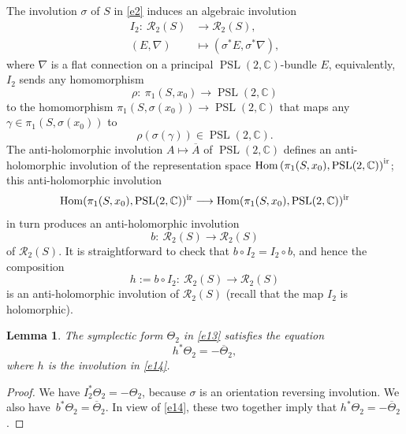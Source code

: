 \documentclass[pdftex]{sigma}
\numberwithin{equation}{section}
\newtheorem{Lemma}[Theorem]{Lemma}
\begin{document}
The involution $\sigma$ of $S$ in \eqref{e2} induces an algebraic involution
\begin{align*}
I_2\colon\ {\mathcal R}_2(S) &\longrightarrow {\mathcal R}_2(S), \\
(E, \nabla)&\longmapsto (\sigma^*E, \sigma^*{\nabla}),
\end{align*}
where $\nabla$ is a flat connection on a principal $\operatorname{PSL}(2,{\mathbb C})$-bundle $E$,
equivalently, $I_2$ sends any homomorphism
\[
\rho\colon\
\pi_1(S, x_0) \longrightarrow \operatorname{PSL}(2, {\mathbb C})
\]
 to the homomorphism
$\pi_1(S, \sigma(x_0)) \longrightarrow \operatorname{PSL}(2,{\mathbb C})$ that maps any
$\gamma \in \pi_1(S, \sigma(x_0))$ to
\[
\rho(\sigma(\gamma))
\in \operatorname{PSL}(2,{\mathbb C}).\]
The anti-holomorphic involution $A \longmapsto \overline{A}$
of $\operatorname{PSL}(2,{\mathbb C})$ defines an anti-holomorphic involution of the representation space
$\operatorname{Hom}\left(\pi_1(S, x_0), \operatorname{PSL}(2,{\mathbb C})\right)^{\rm ir}$; this anti-holomorphic involution
\[
\operatorname{Hom}(\pi_1(S, x_0), \operatorname{PSL}(2,{\mathbb C}))^{\rm ir} \longrightarrow
 \operatorname{Hom}(\pi_1(S, x_0), \operatorname{PSL}(2,{\mathbb C}))^{\rm ir}
 \] in turn produces an
anti-holomorphic involution
\begin{equation}\label{eb}
b\colon\ {\mathcal R}_2(S) \longrightarrow {\mathcal R}_2(S)
\end{equation}
of ${\mathcal R}_2(S)$. It is straightforward to check that $b\circ I_2 = I_2\circ b$,
and hence the composition
\begin{equation}\label{e14}
h := b\circ I_2\colon\ {\mathcal R}_2(S) \longrightarrow {\mathcal R}_2(S)
\end{equation}
is an anti-holomorphic involution of ${\mathcal R}_2(S)$ (recall that the map $I_2$
is holomorphic).

\begin{Lemma}\label{lem1}
The symplectic form $\Theta_2$ in \eqref{e13} satisfies the equation
\[
h^*\Theta_2 = -\overline{\Theta}_2,
\]
where $h$ is the involution in \eqref{e14}.
\end{Lemma}

\begin{proof}
We have $I^*_2\Theta_2 = -\Theta_2$, because $\sigma$ is an orientation reversing involution.
We also have~$b^*\Theta_2 = \overline{\Theta}_2$. In view of
\eqref{e14}, these two together
imply that $h^*\Theta_2 = -\overline{\Theta}_2$.
\end{proof}
\end{document}
